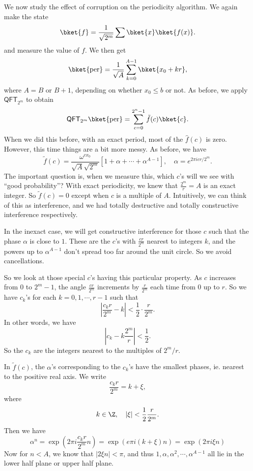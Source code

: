 \documentclass[a4paper]{article}
\newcommand{\qQFT}{\mathsf{QFT}}
\begin{document}
We now study the effect of corruption on the periodicity algorithm. We again make the state
\[
  \bket{f} = \frac{1}{\sqrt{2^m}} \sum \bket{x} \bket{f(x)}.
\]
and measure the value of $f$. We then get
\[
  \bket{\mathrm{per}} = \frac{1}{\sqrt{A}} \sum_{k = 0}^{A - 1} \bket{x_0 + kr},
\]
where $A = B$ or $B + 1$, depending on whether $x_0 \leq b$ or not. As before, we apply $\qQFT_{2^m}$ to obtain
\[
  \qQFT_{2^m}\bket{\mathrm{per}} = \sum_{c = 0}^{2^n - 1} \tilde{f}(c) \bket{c}.
\]
When we did this before, with an exact period, most of the $\hat{f}(c)$ is zero. However, this time things are a bit more messy. As before, we have
\[
  \tilde{f}(c) = \frac{\omega^{c x_0}}{\sqrt{A}\sqrt{2^m}} [1 + \alpha + \cdots + \alpha^{A - 1}],\quad \alpha = e^{2\pi i cr/2^m}.
\]
The important question is, when we measure this, which $c$'s will we see with ``good probability''? With exact periodicity, we knew that $\frac{2^m}{r} = A$ is an exact integer. So $\tilde{f}(c) = 0$ except when $c$ is a multiple of $A$. Intuitively, we can think of this as interference, and we had totally destructive and totally constructive interference respectively.

In the inexact case, we will get constructive interference for those $c$ such that the phase $\alpha$ is close to $1$. These are the $c$'s with $\frac{cr}{2^m}$ nearest to integers $k$, and the powers up to $\alpha^{A - 1}$ don't spread too far around the unit circle. So we avoid cancellations.

So we look at those special $c$'s having this particular property. As $c$ increases from $0$ to $2^m - 1$, the angle $\frac{cr}{2^m}$ increments by $\frac{r}{2^m}$ each time from $0$ up to $r$. So we have $c_k$'s for each $k = 0, 1, \cdots, r - 1$ such that
\[
  \left|\frac{c_k r}{2^m} - k\right| < \frac{1}{2} \cdot \frac{r}{2^m}.
\]
In other words, we have
\[
  \left|c_k - k\frac{2^m}{r}\right| < \frac{1}{2}.
\]
So the $c_k$ are the integers nearest to the multiples of $2^m/r$.

In $\tilde{f}(c)$, the $\alpha$'s corresponding to the $c_k$'s have the smallest phases, ie. nearest to the positive real axis. We write
\[
  \frac{c_k r}{2^m} = k + \xi,
\]
where
\[
  k \in \Z,\quad |\xi| < \frac{1}{2} \frac{r}{2^m}.
\]
Then we have
\[
  \alpha^n = \exp\left(2\pi i \frac{c_k r}{2^m}n\right) = \exp\left(e\pi i(k + \xi)n\right) = \exp(2 \pi i \xi n)
\]
Now for $n < A$, we know that $|2 \xi n| < \pi$, and thus $1, \alpha, \alpha^2, \cdots, \alpha^{A - 1}$ all lie in the lower half plane or upper half plane.
\end{document}
